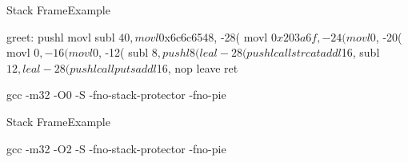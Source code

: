\begin{slide}{Stack Frame}{Example}
  \begin{nicscolumn*}{1cm}{1.2cm}{14cm}
    \begin{nicsextern}[height=5.75cm]{}
greet:
        pushl   %
        movl    %
        subl    $40, %
        movl    $0x6c6c6548, -28(%
        movl    $0x203a6f, -24(%
        movl    $0, -20(%
        movl    $0, -16(%
        movl    $0, -12(%
        subl    $8, %
        pushl   8(%
        leal    -28(%
        pushl   %
        call    strcat
        addl    $16, %
        subl    $12, %
        leal    -28(%
        pushl   %
        call    puts
        addl    $16, %
        nop
        leave
        ret
    \end{nicsextern}
    \kern3mm
    \begin{nicsterm}
      gcc -m32 -O0 -S -fno-stack-protector -fno-pie
    \end{nicsterm}
  \end{nicscolumn*}
\end{slide}

\begin{slide}{Stack Frame}{Example}
  \begin{nicscolumn*}{1cm}{1.5cm}{14cm}
    \kern5mm
    \begin{nicsterm}
      gcc -m32 -O2 -S -fno-stack-protector -fno-pie
    \end{nicsterm}
  \end{nicscolumn*}
\end{slide}

